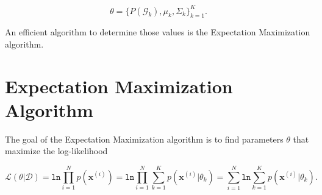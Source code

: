 $$ \theta = \{ P(\mathcal{G}_k), \mu_k, \Sigma_k \}_{k=1}^K.$$

An efficient algorithm to determine those values is the Expectation Maximization algorithm.




\section{Expectation Maximization Algorithm}

The goal of the Expectation Maximization algorithm is to find parameters $\theta$ that maximize the log-likelihood 

\begin{equation}
	\mathcal{L}(\theta | \mathcal{D}) = \mathtt{ln}\prod_{i=1}^{N}p(\mathbf{x}^{(i)}) = \mathtt{ln}\prod_{i=1}^{N}\sum_{k=1}^{K}p(\mathbf{x}^{(i)} | \theta_k) = \sum_{i=1}^{N}\mathtt{ln}\sum_{k=1}^{K}p(\mathbf{x}^{(i)} | \theta_k).
\end{equation}
